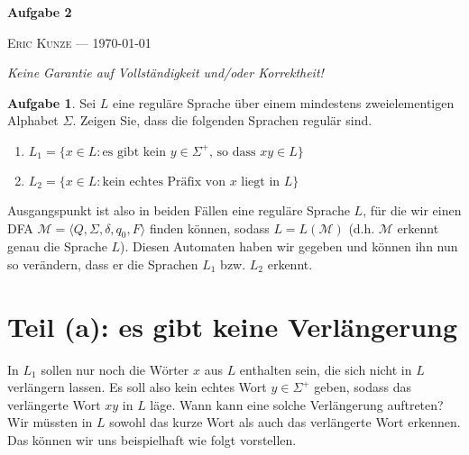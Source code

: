 \documentclass[ngerman, a4paper, 11pt]{scrartcl}
\newcommand*\ruleline[1]{\par\noindent\raisebox{.8ex}{\makebox[\linewidth]{\hrulefill\hspace{1ex}\raisebox{-.8ex}{#1}\hspace{1ex}\hrulefill}}}
\newcommand{\tuple}[1]{\langle #1 \rangle}
\theoremstyle{bsp}
\theoremstyle{definition}
\newtheorem*{aufgabe}{Aufgabe}
\begin{document}
\begin{center}
	{\bfseries \sffamily \huge Aufgabe 2} 
	
	\ruleline{\sffamily \Large Übungsblatt 3}
	
	{\scshape Eric Kunze --- \today}
\end{center}
\medskip

{ \footnotesize \doclicenseThis }

\begin{center}	
	\slshape Keine Garantie auf Vollständigkeit und/oder Korrektheit!
\end{center}

\bigskip

\begin{aufgabe}
	Sei $L$ eine reguläre Sprache über einem mindestens zweielementigen Alphabet $\Sigma$.
	Zeigen Sie, dass die folgenden Sprachen regulär sind.	
\end{aufgabe} 

\begin{enumerate}[label=(\alph*)]
	\item $L_1 =  \{ x \in L : \text{es gibt kein } y \in \Sigma^+ \text{, so dass } xy \in L \}$
	\item $L_2 = \{ x \in L : \text{kein echtes Präfix von $x$ liegt in $L$} \}$
\end{enumerate}

Ausgangspunkt ist also in beiden Fällen eine reguläre Sprache $L$, für die wir einen DFA $\mathcal{M} = \tuple{Q, \Sigma, \delta, q_0, F}$ finden können, sodass $L = L(\mathcal{M})$ (d.h. $\mathcal{M}$ erkennt genau die Sprache $L$). Diesen Automaten haben wir gegeben und können ihn nun so verändern, dass er die Sprachen $L_1$ bzw. $L_2$ erkennt.

\section*{Teil (a): es gibt keine Verlängerung}

In $L_1$ sollen nur noch die Wörter $x$ aus $L$ enthalten sein, die sich nicht in $L$ verlängern lassen. Es soll also kein echtes Wort $y \in \Sigma^+$ geben, sodass das verlängerte Wort $xy$ in $L$ läge.
Wann kann eine solche Verlängerung auftreten? Wir müssten in $L$ sowohl das kurze Wort als auch das verlängerte Wort erkennen. Das können wir uns beispielhaft wie folgt vorstellen.
\end{document}
